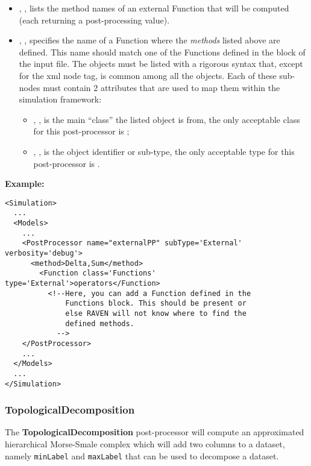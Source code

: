 \begin{itemize}
  \item {}, ,
  lists the method names of an external Function that will be computed (each
  returning a post-processing value).
  \item {}, , specifies
  the name of a Function where the \textit{methods} listed above are defined.
  \nb This name should match one of the Functions defined in the
   block of the input file.
  The objects must be listed with a rigorous syntax that, except for the xml
  node tag, is common among all the objects.
  Each of these sub-nodes must contain 2 attributes that are used to map them
  within the simulation framework:

   \begin{itemize}
     \item {}, , is the main
     ``class'' the listed object is from, the only acceptable class for
     this post-processor is ;
     \item {}, , is the object
     identifier or sub-type, the only acceptable type for this post-processor is
     .
  \end{itemize}
\end{itemize}
\textbf{Example:}
\begin{lstlisting}[style=XML,morekeywords={subType,debug,name,class,type}]
<Simulation>
  ...
  <Models>
    ...
    <PostProcessor name="externalPP" subType='External' verbosity='debug'>
      <method>Delta,Sum</method>
        <Function class='Functions' type='External'>operators</Function>
          <!--Here, you can add a Function defined in the
              Functions block. This should be present or
              else RAVEN will not know where to find the
              defined methods.
            -->
    </PostProcessor>
    ...
  </Models>
  ...
</Simulation>
\end{lstlisting}
\subsubsection{TopologicalDecomposition}
\label{TopologicalDecomposition}
The \textbf{TopologicalDecomposition} post-processor will compute an
approximated hierarchical Morse-Smale complex which will add two columns to a
dataset, namely \texttt{minLabel} and \texttt{maxLabel} that can be used to
decompose a dataset.
%

